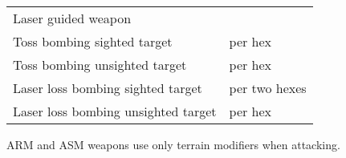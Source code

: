 {\begin{twocolumntablefloat}
\begin{twocolumntable}
\begin{tabularx}{0.7\linewidth}{Ll}
Laser guided weapon                 &  \\
Toss bombing sighted target         & per hex   \\
Toss bombing unsighted target       & per hex   \\
Laser loss bombing sighted target   & per two hexes   \\
Laser loss bombing unsighted target & per hex   \\
\bottomrule
\end{tabularx}
\begin{tablenote}{0.7\linewidth}
ARM and ASM weapons use only terrain modifiers when attacking.


\end{tablenote}
\end{twocolumntable}
\end{twocolumntablefloat}
}
